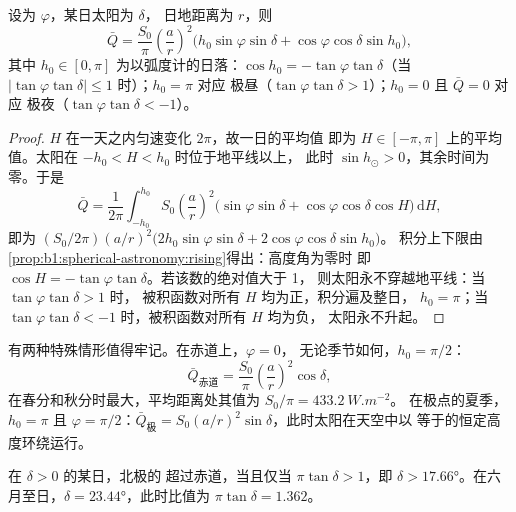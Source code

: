\begin{theorem}[日平均日射量]\label{thm:b1:radiation-heat-transport:daily}
设为 $\varphi$，某日太阳为 $\delta$，
日地距离为 $r$，则
\[
  \bar Q = \frac{S_0}{\pi}\left(\frac{a}{r}\right)^{2}
  \bigl(h_0\sin\varphi\sin\delta + \cos\varphi\cos\delta\sin h_0\bigr),
\]
其中 $h_0 \in [0, \pi]$ 为以弧度计的日落：$\cos h_0 =
-\tan\varphi\tan\delta$（当 $|\tan\varphi\tan\delta| \le 1$ 时）；$h_0 = \pi$ 对应
极昼（$\tan\varphi\tan\delta > 1$）；$h_0 = 0$ 且 $\bar Q = 0$ 对应
极夜（$\tan\varphi\tan\delta < -1$）。
\end{theorem}

\begin{proof}
 $H$ 在一天之内匀速变化 $2\pi$，故一日的平均值
即为 $H \in [-\pi, \pi]$ 上的平均值。太阳在 $-h_0 < H < h_0$ 时位于地平线以上，
此时 $\sin h_\odot > 0$，其余时间为零。于是
\[
  \bar Q = \frac{1}{2\pi}\int_{-h_0}^{h_0} S_0\left(\frac{a}{r}\right)^{2}
  \bigl(\sin\varphi\sin\delta + \cos\varphi\cos\delta\cos H\bigr)\,\mathrm dH ,
\]
即为 $(S_0/2\pi)(a/r)^2\bigl(2h_0\sin\varphi\sin\delta +
2\cos\varphi\cos\delta\sin h_0\bigr)$。
积分上下限由\cref{prop:b1:spherical-astronomy:rising}得出：高度角为零时
即 $\cos H = -\tan\varphi\tan\delta$。若该数的绝对值大于 1，
则太阳永不穿越地平线：当 $\tan\varphi\tan\delta > 1$ 时，
被积函数对所有 $H$ 均为正，积分遍及整日，
$h_0 = \pi$；当 $\tan\varphi\tan\delta < -1$ 时，被积函数对所有 $H$ 均为负，
太阳永不升起。
\end{proof}

有两种特殊情形值得牢记。在赤道上，$\varphi = 0$，
无论季节如何，$h_0 = \pi/2$：
\[
  \bar Q_\text{赤道} = \frac{S_0}{\pi}\left(\frac{a}{r}\right)^{2}\cos\delta ,
\]
在春分和秋分时最大，平均距离处其值为 $S_0/\pi = \qty{433.2}{W.m^{-2}}$。
在极点的夏季，$h_0 = \pi$ 且 $\varphi = \pi/2$：$\bar Q_\text{极} =
S_0(a/r)^2\sin\delta$，此时太阳在天空中以
等于的恒定高度环绕运行。

\begin{proposition}[极地夏季]\label{prop:b1:radiation-heat-transport:polar-summer}
在 $\delta > 0$ 的某日，北极的
超过赤道，当且仅当 $\pi\tan\delta > 1$，即 $\delta >
\ang{17.66}$。在六月至日，$\delta = \ang{23.44}$，此时比值为 $\pi\tan
\delta = 1.362$。
\end{proposition}

